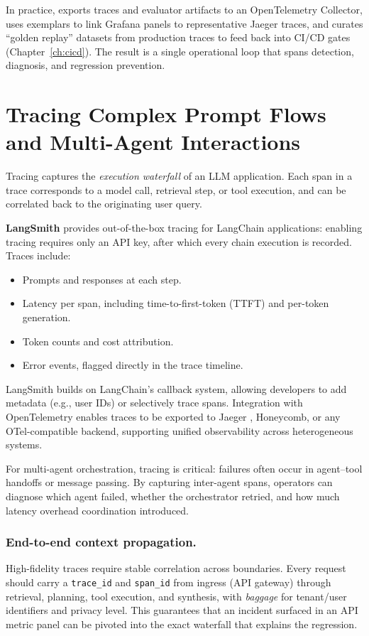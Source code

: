 In practice, \ishtar exports traces and evaluator artifacts to an OpenTelemetry Collector, uses exemplars to link Grafana panels to representative Jaeger traces, and curates ``golden replay'' datasets from production traces to feed back into CI/CD gates (Chapter~\ref{ch:cicd}). The result is a single operational loop that spans detection, diagnosis, and regression prevention.

\section{Tracing Complex Prompt Flows and Multi-Agent Interactions}
\label{sec:tracing-complex-prompt-flows-and-multi-agent-interactions}
Tracing captures the \emph{execution waterfall} of an LLM application. Each span in a trace corresponds to a model call, retrieval step, or tool execution, and can be correlated back to the originating user query.

\textbf{LangSmith} \cite{langsmith_home} provides out-of-the-box tracing for LangChain applications: enabling tracing requires only an API key, after which every chain execution is recorded. Traces include:
\begin{itemize}
    \item Prompts and responses at each step.
    \item Latency per span, including time-to-first-token (TTFT) and per-token generation.
    \item Token counts and cost attribution.
    \item Error events, flagged directly in the trace timeline.
\end{itemize}


\medskip
LangSmith builds on LangChain's callback system, allowing developers to add metadata (e.g., user IDs) or selectively trace spans. Integration with OpenTelemetry \cite{otel_spec} enables traces to be exported to Jaeger \cite{jaeger_tracing}, Honeycomb, or any OTel-compatible backend, supporting unified observability across heterogeneous systems.

For multi-agent orchestration, tracing is critical: failures often occur in agent–tool handoffs or message passing. By capturing inter-agent spans, operators can diagnose which agent failed, whether the orchestrator retried, and how much latency overhead coordination introduced.

\subsubsection{End-to-end context propagation.}
High-fidelity traces require stable correlation across boundaries. Every request should carry a \texttt{trace\_id} and \texttt{span\_id} from ingress (API gateway) through retrieval, planning, tool execution, and synthesis, with \emph{baggage} for tenant/user identifiers and privacy level. This guarantees that an incident surfaced in an API metric panel can be pivoted into the exact waterfall that explains the regression.

